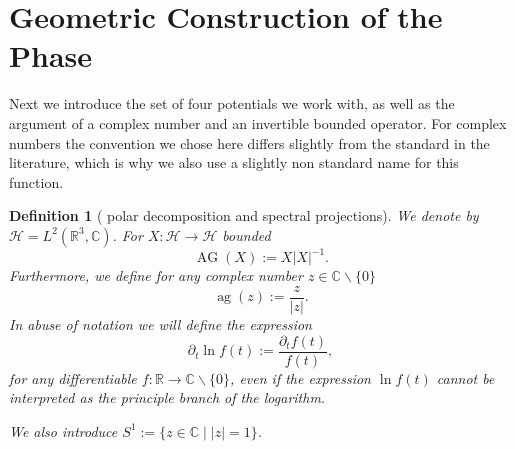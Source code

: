 \documentclass[b5paper,draft,openbib,12pt]{memoir}
\newtheorem{Def}{Definition}
\DeclareMathOperator{\ag}{ag}
\DeclareMathOperator{\AG}{AG}
\begin{document}
\section{Geometric Construction of the Phase}\label{chapter geometery}
Next we introduce the set of four potentials we work with, as well as the argument of a complex number and an 
invertible bounded operator. For complex numbers the convention we chose here differs slightly from the standard in the literature,
which is why we also use a slightly non standard name for this function.
\begin{Def}[ polar decomposition and spectral projections]
We denote by \(\mathcal{H}=L^2(\mathbb{R}^3,\mathbb{C})\).
For \(X:\mathcal{H}\rightarrow \mathcal{H}\) bounded
\begin{equation}\label{def AG}
\AG(X):=X |X|^{-1}.
\end{equation}
Furthermore, we define for any complex number \(z\in \mathbb{C}\backslash \{0\}\)
\begin{equation}
\ag(z):=\frac{z}{|z|} .
\end{equation}
In abuse of notation we will define the expression
\begin{equation}
\partial_t \ln f(t):=\frac{\partial_t f(t)}{f(t)},
\end{equation}
for any differentiable \(f:\mathbb{R}\rightarrow \mathbb{C}\backslash \{0\} \), 
even if the expression \(\ln f(t)\) cannot be interpreted as the principle
branch of the logarithm.

We also introduce \(S^1:=\{z\in\mathbb{C}\mid |z|=1\}\).

\end{Def}
\end{document}
